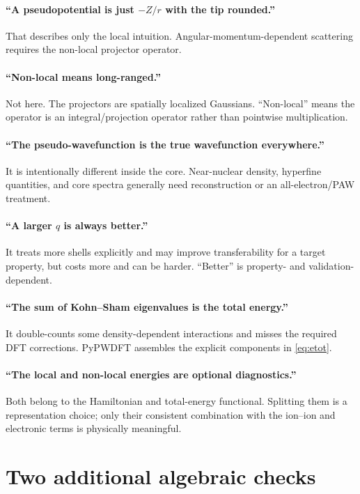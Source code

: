 \documentclass[10pt,twocolumn]{article}
\begin{document}
\paragraph{``A pseudopotential is just \( -Z/r\) with the tip rounded.''}
That describes only the local intuition.  Angular-momentum-dependent
scattering requires the non-local projector operator.

\paragraph{``Non-local means long-ranged.''}
Not here.  The projectors are spatially localized Gaussians.  ``Non-local''
means the operator is an integral/projection operator rather than pointwise
multiplication.

\paragraph{``The pseudo-wavefunction is the true wavefunction everywhere.''}
It is intentionally different inside the core.  Near-nuclear density,
hyperfine quantities, and core spectra generally need reconstruction or an
all-electron/PAW treatment.

\paragraph{``A larger \(q\) is always better.''}
It treats more shells explicitly and may improve transferability for a target
property, but costs more and can be harder.  ``Better'' is property- and
validation-dependent.

\paragraph{``The sum of Kohn--Sham eigenvalues is the total energy.''}
It double-counts some density-dependent interactions and misses the required
DFT corrections.  PyPWDFT assembles the explicit components in
\cref{eq:etot}.

\paragraph{``The local and non-local energies are optional diagnostics.''}
Both belong to the Hamiltonian and total-energy functional.  Splitting them
is a representation choice; only their consistent combination with the
ion--ion and electronic terms is physically meaningful.

\section{Two additional algebraic checks}
\end{document}
